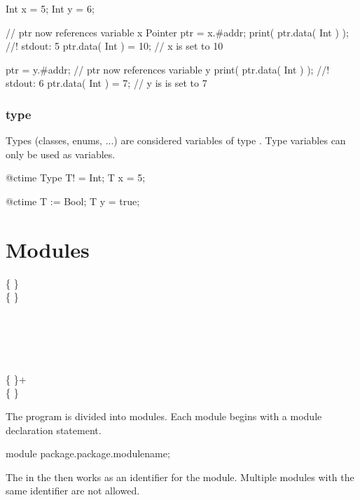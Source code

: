 \begin{code}
Int x = 5;
Int y = 6;

// ptr now references variable x
Pointer ptr = x.#addr;
print( ptr.data( Int ) ); //! stdout: 5
ptr.data( Int ) = 10; // x is set to 10

ptr = y.#addr; // ptr now references variable y
print( ptr.data( Int ) ); //! stdout: 6
ptr.data( Int ) = 7; // y is is set to 7
\end{code}

\subsection{ type} \label{typeType}
Types (classes, enums, ...) are considered \ctime variables of type . Type variables can only be used as \ctime variables. \nopagebreak

\begin{code}
@ctime Type T! = Int;
T x = 5;

@ctime T := Bool;
T y = true;
\end{code}

\chapter{Modules}
\begin{grammar}
	   \kwd{;} \{  \} \\
	  \{   \} \\
	\\
	  \\
		\grAltLn {} \\
		\grAltLn {} \\
		\grAltLn {} \\
	 \{  \}+ \kwd{:} \\
	 \{  \} \kwd{\{}  \kwd{\}} \\
\end{grammar}

The program is divided into modules. Each module begins with a module declaration statement.
\begin{code}
module package.package.modulename;
\end{code}

The  in the  then works as an identifier for the module. Multiple modules with the same identifier are not allowed.

